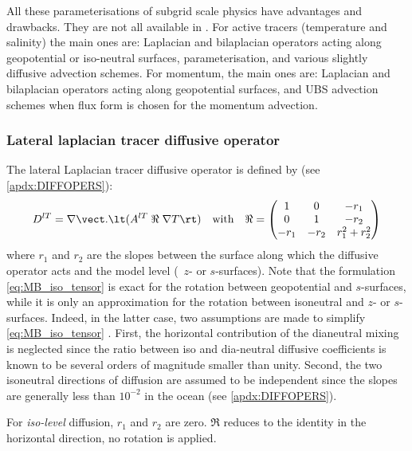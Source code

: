 \documentclass[../main/NEMO_manual]{subfiles}
\begin{document}
All these parameterisations of subgrid scale physics have advantages and drawbacks.
They are not all available in \NEMO.
For active tracers (temperature and salinity) the main ones are:
Laplacian and bilaplacian operators acting along geopotential or iso-neutral surfaces,
\citet{gent.mcwilliams_JPO90} parameterisation, and various slightly diffusive advection schemes.
For momentum, the main ones are:
Laplacian and bilaplacian operators acting along geopotential surfaces,
and UBS advection schemes when flux form is chosen for the momentum advection.

\subsubsection{Lateral laplacian tracer diffusive operator}

The lateral Laplacian tracer diffusive operator is defined by (see \autoref{apdx:DIFFOPERS}):
\begin{equation}
  \label{eq:MB_iso_tensor}
  D^{lT} = \nabla \vect . \lt( A^{lT} \; \Re \; \nabla T \rt) \quad \text{with} \quad \Re =
  \begin{pmatrix}
    1    & 0    & -r_1          \\
    0    & 1    & -r_2          \\
    -r_1 & -r_2 & r_1^2 + r_2^2 \\
  \end{pmatrix}
\end{equation}
where $r_1$ and $r_2$ are the slopes between the surface along which the diffusive operator acts and
the model level (\eg\ $z$- or $s$-surfaces).
Note that the formulation \autoref{eq:MB_iso_tensor} is exact for
the rotation between geopotential and $s$-surfaces,
while it is only an approximation for the rotation between isoneutral and $z$- or $s$-surfaces.
Indeed, in the latter case, two assumptions are made to simplify \autoref{eq:MB_iso_tensor}
\citep{cox_OM87}.
First, the horizontal contribution of the dianeutral mixing is neglected since
the ratio between iso and dia-neutral diffusive coefficients is known to be
several orders of magnitude smaller than unity.
Second, the two isoneutral directions of diffusion are assumed to be independent since
the slopes are generally less than $10^{-2}$ in the ocean (see \autoref{apdx:DIFFOPERS}).

For \textit{iso-level} diffusion, $r_1$ and $r_2 $ are zero.
$\Re$ reduces to the identity in the horizontal direction, no rotation is applied.
\end{document}
